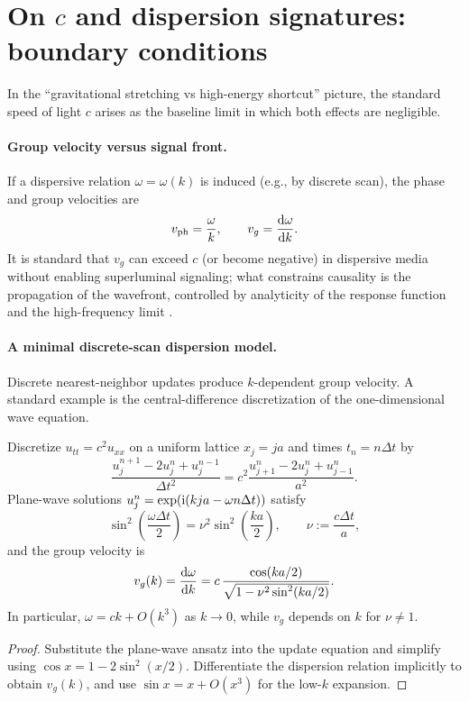 \section{On \texorpdfstring{$c$}{c} and dispersion signatures: boundary conditions}
\label{app:c_dispersion}

In the ``gravitational stretching vs high-energy shortcut'' picture, the standard speed of light $c$ arises as the baseline limit in which both effects are negligible.

\paragraph{Group velocity versus signal front.}
If a dispersive relation $\omega=\omega(k)$ is induced (e.g., by discrete scan), the phase and group velocities are
\begin{equation}
v_{\mathrm{ph}}=\frac{\omega}{k},\qquad v_g=\frac{\mathrm{d}\omega}{\mathrm{d} k}.
\end{equation}
It is standard that $v_g$ can exceed $c$ (or become negative) in dispersive media without enabling superluminal signaling; what constrains causality is the propagation of the wavefront, controlled by analyticity of the response function and the high-frequency limit \cite{Brillouin1960,Jackson1998}.

\paragraph{A minimal discrete-scan dispersion model.}
Discrete nearest-neighbor updates produce $k$-dependent group velocity. A standard example is the central-difference discretization of the one-dimensional wave equation.
\begin{proposition}\label{prop:discrete_scan_dispersion}
Discretize $u_{tt}=c^2u_{xx}$ on a uniform lattice $x_j=ja$ and times $t_n=n\Delta t$ by
\begin{equation}
\frac{u^{n+1}_j-2u^n_j+u^{n-1}_j}{\Delta t^2}
=c^2\frac{u^n_{j+1}-2u^n_j+u^n_{j-1}}{a^2}.
\end{equation}
Plane-wave solutions $u^n_j=\exp(\mathrm{i}(kja-\omega n\Delta t))$ satisfy
\begin{equation}
\sin^2\!\left(\frac{\omega\Delta t}{2}\right)=\nu^2\sin^2\!\left(\frac{ka}{2}\right),
\qquad
\nu:=\frac{c\Delta t}{a},
\end{equation}
and the group velocity is
\begin{equation}
v_g(k)=\frac{\mathrm{d}\omega}{\mathrm{d} k}
=c\,\frac{\cos(ka/2)}{\sqrt{1-\nu^2\sin^2(ka/2)}}.
\end{equation}
In particular, $\omega=ck+O(k^3)$ as $k\to 0$, while $v_g$ depends on $k$ for $\nu\neq 1$.
\end{proposition}
\begin{proof}
Substitute the plane-wave ansatz into the update equation and simplify using $\cos x=1-2\sin^2(x/2)$. Differentiate the dispersion relation implicitly to obtain $v_g(k)$, and use $\sin x=x+O(x^3)$ for the low-$k$ expansion.
\end{proof}

